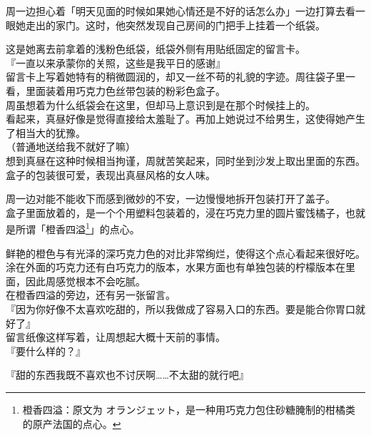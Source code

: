 周一边担心着「明天见面的时候如果她心情还是不好的话怎么办」一边打算去看一眼她走出的家门。这时，他突然发现自己房间的门把手上挂着一个纸袋。

这是她离去前拿着的浅粉色纸袋，纸袋外侧有用贴纸固定的留言卡。\\

『一直以来承蒙你的关照，这些是我平日的感谢』\\

留言卡上写着她特有的稍微圆润的，却又一丝不苟的礼貌的字迹。周往袋子里一看，里面装着用巧克力色丝带包装的粉彩色盒子。\\

周虽想着为什么纸袋会在这里，但却马上意识到是在那个时候挂上的。\\

看起来，真昼好像是觉得直接给太羞耻了。再加上她说过不给男生，这使得她产生了相当大的犹豫。\\

（普通地送给我不就好了嘛）\\

想到真昼在这种时候相当拘谨，周就苦笑起来，同时坐到沙发上取出里面的东西。\\

盒子的包装很可爱，表现出真昼风格的女人味。

周一边对能不能收下而感到微妙的不安，一边慢慢地拆开包装打开了盖子。\\

盒子里面放着的，是一个个用塑料包装着的，浸在巧克力里的圆片蜜饯橘子，也就是所谓「橙香四溢\footnote{橙香四溢：原文为 {\jpfont オランジェット}，是一种用巧克力包住砂糖腌制的柑橘类的原产法国的点心。}」的点心。

鲜艳的橙色与有光泽的深巧克力色的对比非常绚烂，使得这个点心看起来很好吃。\\

涂在外面的巧克力还有白巧克力的版本，水果方面也有单独包装的柠檬版本在里面，因此周感觉根本不会吃腻。\\

在橙香四溢的旁边，还有另一张留言。\\

『因为你好像不太喜欢吃甜的，所以我做成了容易入口的东西。要是能合你胃口就好了』\\

留言纸像这样写着，让周想起大概十天前的事情。\\

『要什么样的？』

『甜的东西我既不喜欢也不讨厌啊……不太甜的就行吧』\\

